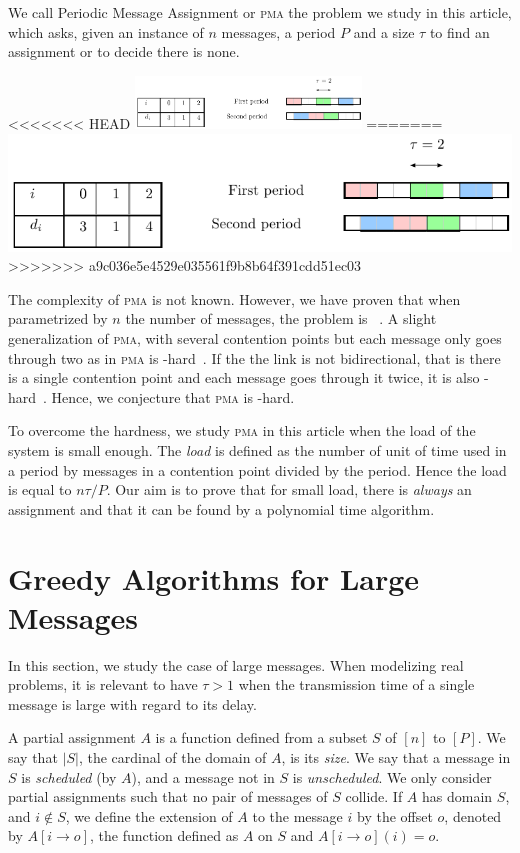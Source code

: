 \documentclass[10pt, conference, letterpaper]{IEEEtran}
\newcommand\pma{\textsc{pma}\xspace}
\begin{document}
We call Periodic Message Assignment or \pma the problem we study in this article,
which asks, given an instance of $n$ messages, a period $P$ and a size $\tau$ to find 
an assignment or to decide there is none.
\begin{center}
<<<<<<< HEAD
\includegraphics[width=0.45\textwidth]{instance}
=======
\includegraphics[scale=0.7]{instance}
>>>>>>> a9c036e5e4529e035561f9b8b64f391cdd51ec03
\end{center}
The complexity of \pma is not known. However, we have proven that when parametrized by
$n$ the number of messages, the problem is \FPT~\cite{barth2018deterministic}.
A slight generalization of \pma, with several contention points but each message only goes through two as in \pma is \NP-hard~\cite{barth2018deterministic}. If the the link is not bidirectional, that is there is a single contention point and each message goes through it twice, it is also \NP-hard~\cite{}. Hence, we conjecture that \pma is \NP-hard.

To overcome the hardness, we study \pma in this article when the load of the system is small enough. The \emph{load} is defined as the number of unit of time used in a period by messages in a contention point divided by the period. Hence the load is equal to $n\tau /P$.
Our aim is to prove that for small load, there is \emph{always} an assignment and that it can be found by a polynomial time algorithm.


\section{Greedy Algorithms for Large Messages}

In this section, we study the case of large messages. When modelizing real problems,
it is relevant to have $\tau > 1$ when the transmission time of a single message is large with regard to its delay.


A partial assignment $A$ is a function defined from a subset $S$ of $[n]$ to $[P]$.
We say that $|S|$, the cardinal of the domain of $A$, is its \emph{size}.
We say that a message in $S$ is \emph{scheduled} (by $A$), and a message not in $S$ is \emph{unscheduled}. We only consider partial assignments such that no pair of messages of $S$ collide. If $A$ has domain $S$, and $i \notin S$, we define the extension of $A$ to the message $i$ by the offset $o$, denoted by $A[i \rightarrow o]$, the function defined as $A$ on $S$ and $A[i \rightarrow o](i) = o$.
\end{document}
